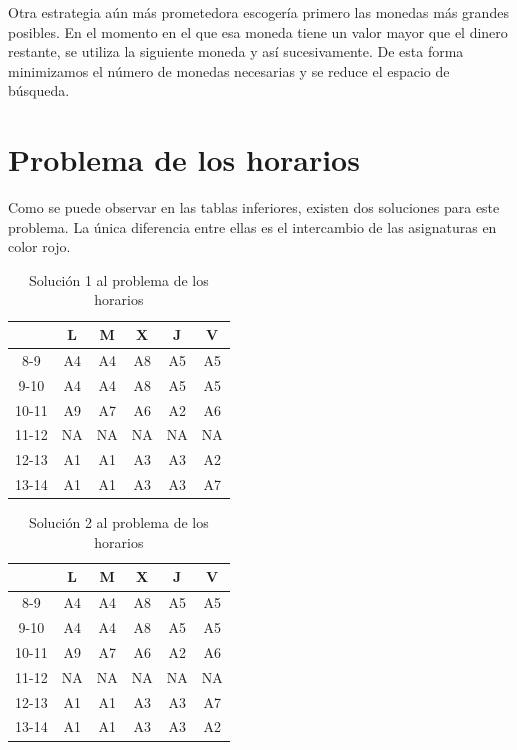 \documentclass[12pt]{article} %
\begin{document}
Otra estrategia aún más prometedora escogería primero las monedas más grandes posibles. En el momento en el que esa moneda tiene un valor mayor que el dinero restante, se utiliza la siguiente moneda y así sucesivamente. De esta forma minimizamos el número de monedas necesarias y se reduce el espacio de búsqueda.

\section{Problema de los horarios}
Como se puede observar en las tablas inferiores, existen dos soluciones para este problema. La única diferencia entre ellas es el intercambio de las asignaturas en color rojo.

\begin{table}[H]
\centering
\begin{tabular}{c|ccccc}
\multicolumn{1}{l|}{} & L  & M  & X  & J  & V  \\ \hline
8-9                   & A4 & A4 & A8 & A5 & A5 \\
9-10                  & A4 & A4 & A8 & A5 & A5 \\
10-11                 & A9 & A7 & A6 & A2 & A6 \\
11-12                 & NA & NA & NA & NA & NA \\
12-13                 & A1 & A1 & A3 & A3 & \color{red}A2 \\
13-14                 & A1 & A1 & A3 & A3 & \color{red}A7
\end{tabular}
\caption{Solución 1 al problema de los horarios}
\label{tab:my-table}
\end{table}
\vspace{2pt}
\begin{table}[H]
\centering
\begin{tabular}{c|ccccc}
\multicolumn{1}{l|}{} & L  & M  & X  & J  & V  \\ \hline
8-9                   & A4 & A4 & A8 & A5 & A5 \\
9-10                  & A4 & A4 & A8 & A5 & A5 \\
10-11                 & A9 & A7 & A6 & A2 & A6 \\
11-12                 & NA & NA & NA & NA & NA \\
12-13                 & A1 & A1 & A3 & A3 & \color{red}A7 \\
13-14                 & A1 & A1 & A3 & A3 & \color{red}A2
\end{tabular}
\caption{Solución 2 al problema de los horarios}
\label{tab:my-table}
\end{table}
\end{document}
